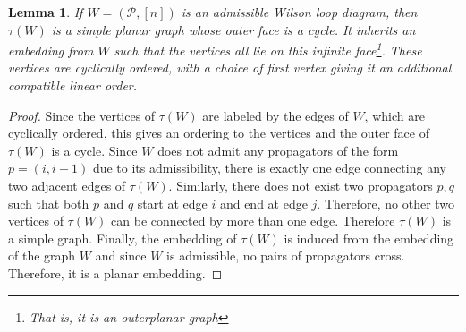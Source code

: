 \documentclass[11pt]{article}
\newcommand{\cP}{\mathcal{P}}
\newtheorem{lem}[thm]{Lemma}
\theoremstyle{remark}
\theoremstyle{definition}
\begin{document}
\begin{lem}\label{tausimpleplanarlem}
If $W = (\cP, [n])$ is an admissible Wilson loop diagram, then $\tau(W)$ is a simple planar graph whose outer face is a cycle. It inherits an embedding from $W$ such that the vertices all lie on this infinite face\footnote{That is, it is an \emph{outerplanar} graph}. These vertices are cyclically ordered, with a choice of first vertex giving it an additional compatible linear order.
\end{lem}

\begin{proof}
Since the vertices of $\tau(W)$ are labeled by the edges of $W$, which are cyclically ordered, this gives an ordering to the vertices and the outer face of $\tau(W)$ is a cycle.  Since $W$ does not admit any propagators of the form $p = (i, i+1)$ due to its admissibility, there is exactly one edge connecting any two adjacent edges of $\tau(W)$. Similarly, there does not exist two propagators $p,q$ such that both $p$ and $q$ start at edge $i$ and end at edge $j$. Therefore, no other two vertices of $\tau(W)$ can be connected by more than one edge.  Therefore $\tau(W)$ is a simple graph. Finally, the embedding of $\tau(W)$ is induced from the embedding of the graph $W$ and since $W$ is admissible, no pairs of propagators cross. Therefore, it is a planar embedding. 
 \end{proof}
\end{document}
